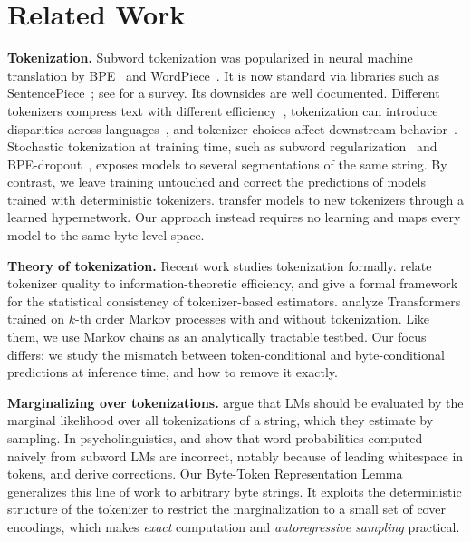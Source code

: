 \documentclass{article} %
\begin{document}
\section{Related Work}
\label{sec:related_work}
\textbf{Tokenization.}
Subword tokenization was popularized in neural machine translation by BPE~\citep{sennrich2016neural} and WordPiece~\citep{schuster2012japanese}. It is now standard via libraries such as SentencePiece~\citep{kudo2018sentencepiece}; see \citet{mielke2021between} for a survey. Its downsides are well documented. Different tokenizers compress text with different efficiency~\citep{bostrom2020byte,rust2021good}, tokenization can introduce disparities across languages~\citep{petrov2023language}, and tokenizer choices affect downstream behavior~\citep{dagan2024getting}. Stochastic tokenization at training time, such as subword regularization~\citep{kudo2018subword} and BPE-dropout~\citep{provilkov2020bpe}, exposes models to several segmentations of the same string. By contrast, we leave training untouched and correct the predictions of models trained with deterministic tokenizers. \citet{minixhofer2024zero} transfer models to new tokenizers through a learned hypernetwork. Our approach instead requires no learning and maps every model to the same byte-level space.

\textbf{Theory of tokenization.}
Recent work studies tokenization formally. \citet{zouhar2023tokenization} relate tokenizer quality to information-theoretic efficiency, and \citet{gastaldi2024foundations} give a formal framework for the statistical consistency of tokenizer-based estimators. \citet{rajaraman2024toward} analyze Transformers trained on $k$-th order Markov processes with and without tokenization. Like them, we use Markov chains as an analytically tractable testbed. Our focus differs: we study the mismatch between token-conditional and byte-conditional predictions at inference time, and how to remove it exactly.

\textbf{Marginalizing over tokenizations.}
\citet{cao2021you} argue that LMs should be evaluated by the marginal likelihood over all tokenizations of a string, which they estimate by sampling. In psycholinguistics, \citet{pimentel2024compute} and \citet{oh2024leading} show that word probabilities computed naively from subword LMs are incorrect, notably because of leading whitespace in tokens, and derive corrections. Our Byte-Token Representation Lemma generalizes this line of work to arbitrary byte strings. It exploits the deterministic structure of the tokenizer to restrict the marginalization to a small set of cover encodings, which makes \emph{exact} computation and \emph{autoregressive sampling} practical.
\end{document}
